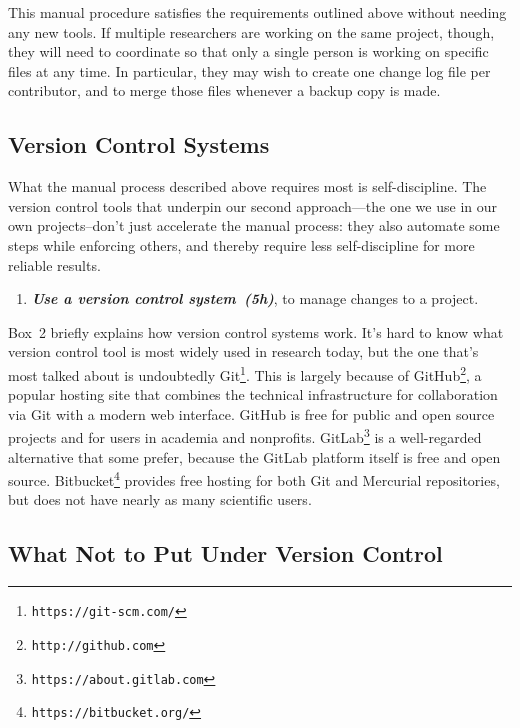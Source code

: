 \documentclass[10pt,letterpaper]{article}
\newcommand{\withurl}[2]{{#1}\footnote{{\texttt{#2}}}}
\newcommand{\practice}[2]{\textbf{\emph{{#2}~({#1})}}}
\begin{document}
This manual procedure satisfies the requirements outlined above
without needing any new tools. If multiple researchers are working on
the same project, though, they will need to coordinate so that only a
single person is working on specific files at any time. In particular,
they may wish to create one change log file per contributor, and to
merge those files whenever a backup copy is made.

\subsection*{Version Control Systems}

What the manual process described above requires most is
self-discipline. The version control tools that underpin our second
approach---the one we use in our own projects--don't just accelerate
the manual process: they also automate some steps while enforcing
others, and thereby require less self-discipline for more reliable
results.

\begin{enumerate}

\item

  \practice{5h}{Use a version control system}, to manage changes to a
  project.

\end{enumerate}

Box~2 briefly explains how version control systems work.  It's hard to
know what version control tool is most widely used in research today,
but the one that's most talked about is undoubtedly
\withurl{Git}{https://git-scm.com/}. This is largely because of
\withurl{GitHub}{http://github.com}, a popular hosting site that
combines the technical infrastructure for collaboration via Git with a
modern web interface. GitHub is free for public and open source
projects and for users in academia and nonprofits.
\withurl{GitLab}{https://about.gitlab.com} is a well-regarded
alternative that some prefer, because the GitLab platform itself is
free and open source. \withurl{Bitbucket}{https://bitbucket.org/}
provides free hosting for both Git and Mercurial repositories, but
does not have nearly as many scientific users.

\subsection*{What Not to Put Under Version Control}
\end{document}
